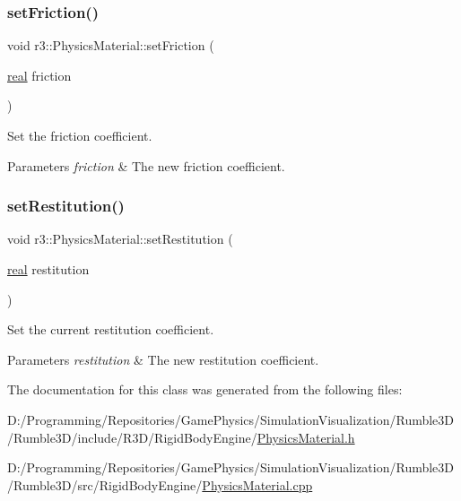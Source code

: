 \subsubsection{\texorpdfstring{set\+Friction()}{setFriction()}}
{\footnotesize\ttfamily void r3\+::\+Physics\+Material\+::set\+Friction (\begin{DoxyParamCaption}\item[{\mbox{\hyperlink{namespacer3_ab2016b3e3f743fb735afce242f0dc1eb}{real}}}]{friction }\end{DoxyParamCaption})}



Set the friction coefficient. 


\begin{DoxyParams}{Parameters}
{\em friction} & The new friction coefficient. \\
\hline
\end{DoxyParams}
\mbox{\label{classr3_1_1_physics_material_a2056c195a2d655aefe9a480c28e67ddb}} 
\subsubsection{\texorpdfstring{set\+Restitution()}{setRestitution()}}
{\footnotesize\ttfamily void r3\+::\+Physics\+Material\+::set\+Restitution (\begin{DoxyParamCaption}\item[{\mbox{\hyperlink{namespacer3_ab2016b3e3f743fb735afce242f0dc1eb}{real}}}]{restitution }\end{DoxyParamCaption})}



Set the current restitution coefficient. 


\begin{DoxyParams}{Parameters}
{\em restitution} & The new restitution coefficient. \\
\hline
\end{DoxyParams}


The documentation for this class was generated from the following files\+:\begin{DoxyCompactItemize}
\item 
D\+:/\+Programming/\+Repositories/\+Game\+Physics/\+Simulation\+Visualization/\+Rumble3\+D/\+Rumble3\+D/include/\+R3\+D/\+Rigid\+Body\+Engine/\mbox{\hyperlink{_physics_material_8h}{Physics\+Material.\+h}}\item 
D\+:/\+Programming/\+Repositories/\+Game\+Physics/\+Simulation\+Visualization/\+Rumble3\+D/\+Rumble3\+D/src/\+Rigid\+Body\+Engine/\mbox{\hyperlink{_physics_material_8cpp}{Physics\+Material.\+cpp}}\end{DoxyCompactItemize}
